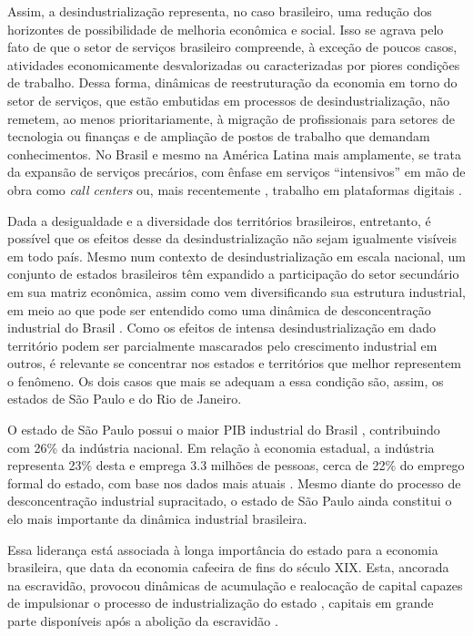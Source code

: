 Assim, a desindustrialização representa, no caso brasileiro, uma redução
dos horizontes de possibilidade de melhoria econômica e social. Isso se
agrava pelo fato de que o setor de serviços brasileiro compreende, à
exceção de poucos casos, atividades economicamente desvalorizadas ou
caracterizadas por piores condições de trabalho. Dessa forma, dinâmicas
de reestruturação da economia em torno do setor de serviços, que estão
embutidas em processos de desindustrialização, não remetem, ao menos
prioritariamente, à migração de profissionais para setores de tecnologia
ou finanças e de ampliação de postos de trabalho que demandam
conhecimentos. No Brasil e mesmo na América Latina mais amplamente, se
trata da expansão de serviços precários, com ênfase em serviços
``intensivos'' em mão de obra como \emph{call centers} ou, mais
recentemente , trabalho em plataformas digitais
\citep{bridioliveirasalas2023}.

Dada a desigualdade e a diversidade dos territórios brasileiros,
entretanto, é possível que os efeitos desse da desindustrialização não
sejam igualmente visíveis em todo país. Mesmo num contexto de
desindustrialização em escala nacional, um conjunto de estados
brasileiros têm expandido a participação do setor secundário em sua
matriz econômica, assim como vem diversificando sua estrutura
industrial, em meio ao que pode ser entendido como uma dinâmica de
desconcentração industrial do Brasil
\citep{cni2021}. Como os
efeitos de intensa desindustrialização em dado território podem ser
parcialmente mascarados pelo crescimento industrial em outros, é
relevante se concentrar nos estados e territórios que melhor representem
o fenômeno. Os dois casos que mais se adequam a essa condição são,
assim, os estados de São Paulo e do Rio de Janeiro.

O estado de São Paulo possui o maior PIB industrial do Brasil
\citep{cni_sd},
contribuindo com 26\% da indústria nacional. Em relação à economia
estadual, a indústria representa 23\% desta e emprega 3.3 milhões de
pessoas, cerca de 22\% do emprego formal do estado, com base nos dados
mais atuais \citep{cni_sd}. Mesmo diante do processo de desconcentração industrial
supracitado, o estado de São Paulo ainda constitui o elo mais importante
da dinâmica industrial brasileira.

Essa liderança está associada à longa importância do estado para a
economia brasileira, que data da economia cafeeira de fins do século
XIX. Esta, ancorada na escravidão, provocou dinâmicas de acumulação e
realocação de capital capazes de impulsionar o processo de
industrialização do estado
\citep{lanna_casas_2019},
capitais em grande parte disponíveis após a abolição da escravidão .

